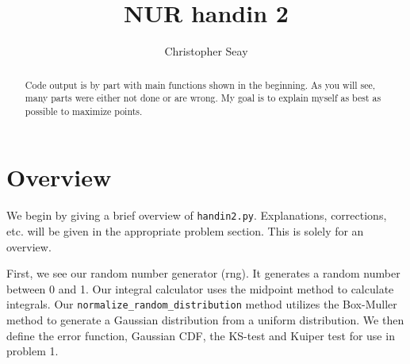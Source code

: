 \documentclass[a4paper,10pt]{article}
\title{NUR handin 2}
\author{Christopher Seay}
\begin{document}
\maketitle

\begin{abstract}
 Code output is by part with main functions shown in the beginning.
 As you will see, many parts were either not done or are wrong. 
 My goal is to explain myself as best as possible to maximize points.
\end{abstract}

\section{Overview}
 We begin by giving a brief overview of \texttt{handin2.py}. Explanations,
 corrections, etc. will be given in the appropriate problem section. This is
 solely for an overview.
 
First, we see our random number generator (rng). It generates a random number
between 0 and 1. Our integral calculator uses the midpoint method to calculate 
integrals. Our \texttt{normalize\_random\_distribution} method utilizes the
Box-Muller method to generate a Gaussian distribution from a uniform 
distribution. We then define the error function, Gaussian CDF, the 
KS-test and Kuiper test for use in problem 1.



















% 

% 



% 

% 

% 

% 

% 

% 





% 
\end{document}
